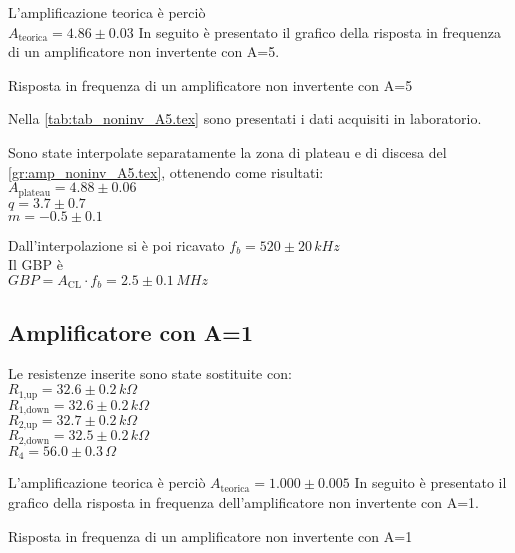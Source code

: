 L'amplificazione teorica è perciò\\
$A_\textrm{teorica} = 4.86 \pm 0.03$
In seguito è presentato il grafico della risposta in frequenza di un amplificatore non invertente con A=5.
\begin{grafico}
 \centering 
  \resizebox{\textwidth}{!}{%
  
  }%
 \caption{Risposta in frequenza di un amplificatore non invertente con A=5} 
 \label{gr:amp_noninv_A5.tex} 
\end{grafico}
Nella \autoref{tab:tab_noninv_A5.tex} sono presentati i dati acquisiti in laboratorio.

%    
Sono state interpolate separatamente la zona di plateau e di discesa del  \autoref{gr:amp_noninv_A5.tex}, ottenendo come risultati:\\
$A_\textrm{plateau}=4.88 \pm 0.06$\\
$q = 3.7 \pm 0.7$\\
$m = -0.5 \pm 0.1$

Dall'interpolazione si è poi ricavato 
$f_b= 520 \pm 20 \,kHz $\\
Il GBP è\\
$GBP=A_\textrm{CL} \cdot f_b = 2.5 \pm 0.1 \,MHz$



\subsection{Amplificatore con A=1}
Le resistenze inserite sono state sostituite con:\\
$R_\textrm{1,up}=32.6 \pm 0.2 \,k\Omega $\\ %
$R_\textrm{1,down}=32.6 \pm 0.2\,k\Omega$\\ %
$R_\textrm{2,up}=32.7 \pm 0.2\,k\Omega$\\ %
$R_\textrm{2,down}=32.5 \pm 0.2\,k\Omega$\\
$R_4=56.0 \pm 0.3\,\Omega$

L'amplificazione teorica è perciò
$A_\textrm{teorica} = 1.000 \pm 0.005$
In seguito è presentato il grafico della risposta in frequenza dell'amplificatore non invertente con A=1.

\begin{grafico}
 \centering 
  \resizebox{\textwidth}{!}{%
  
 }%
 \caption{Risposta in frequenza di un amplificatore non invertente con A=1} 
 \label{gr:amp_noninv_A1.tex} 
\end{grafico}

